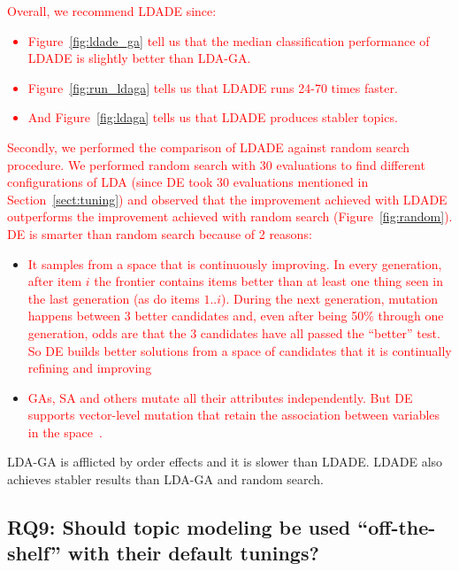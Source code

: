 \documentclass[twocolumn,5p,sort&compress]{elsarticle}
\newcommand{\bi}{\begin{itemize}}
\newcommand{\ei}{\end{itemize}}
\theoremstyle{break}
\begin{document}
\textcolor{red}{Overall, we recommend LDADE since:
\bi
\item Figure~\ref{fig:ldade_ga}
tell us that the
median classification performance of
  LDADE is slightly better than LDA-GA.
\item  Figure~\ref{fig:run_ldaga} tells us that
LDADE runs  24-70 times faster.
\item  
And Figure~\ref{fig:ldaga} tells us
that LDADE produces stabler
topics.
\ei}
 
\textcolor{red}{Secondly, we performed the comparison of LDADE against random search procedure.
We performed random search with 30 evaluations to find different configurations of LDA (since DE took 30 evaluations mentioned in Section~\ref{sect:tuning}) and observed that the improvement achieved with LDADE outperforms the improvement achieved with random search (Figure~\ref{fig:random}). DE is smarter than random search because of 2 reasons:} 
\bi
\item \textcolor{red}{It samples from a space that is continuously improving. In every generation, after item $i$ the frontier contains   items
  better than at least one thing
seen in the last generation (as do  items $1..i$).   During the next generation, mutation happens between 3 better candidates
and, even after being 50\% through one generation,
odds are that the 3 candidates have all passed the ``better''
test. So DE builds better solutions
from a space of candidates that it is continually
refining and improving}
\item \textcolor{red}{GAs, SA and others mutate all their
attributes independently. But DE  supports vector-level mutation that retain the association between variables in the space~\cite{das2011differential}.}
\ei



  \begin{lesson}
    LDA-GA is afflicted  by order effects and it is slower than LDADE.  LDADE also achieves stabler results than LDA-GA and random search. 
  \end{lesson}



\subsection{\textbf{RQ9: Should topic modeling be used ``off-the-shelf'' with their default tunings?}}
\label{sect:rq9}
\end{document}
